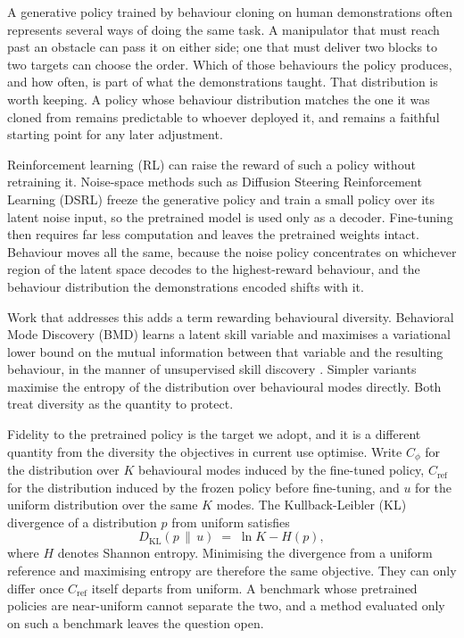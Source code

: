 \documentclass[preprint,12pt]{elsarticle}
\begin{document}
A generative policy trained by behaviour cloning on human demonstrations often
represents several ways of doing the same task. A manipulator that must reach
past an obstacle can pass it on either side; one that must deliver two blocks to
two targets can choose the order. Which of those behaviours the policy produces, and how often, is part of what
the demonstrations taught. That distribution is worth keeping. A policy whose
behaviour distribution matches the one it was cloned from remains predictable to
whoever deployed it, and remains a faithful starting point for any later
adjustment.

Reinforcement learning (RL) can raise the reward of such a policy without
retraining it. Noise-space methods such as Diffusion Steering Reinforcement
Learning (DSRL)
\citep{wagenmaker2025dsrl} freeze the generative policy and train a small
policy over its latent noise input, so the pretrained model is used only as a
decoder. Fine-tuning then requires far less computation and leaves the
pretrained weights intact. Behaviour moves all the same, because the noise policy
concentrates on whichever region of the latent space decodes to the
highest-reward behaviour, and the behaviour distribution the demonstrations
encoded shifts with it.

Work that addresses this adds a term rewarding behavioural diversity. Behavioral
Mode Discovery (BMD) \citep{longhini2026bmd} learns a latent skill variable and
maximises a variational lower bound on the mutual information between that
variable and the resulting behaviour, in the manner of unsupervised skill
discovery \citep{eysenbach2018diayn}. Simpler variants maximise the entropy of
the distribution over behavioural modes directly. Both treat diversity as the
quantity to protect.

Fidelity to the pretrained policy is the target we adopt, and it is a different
quantity from the diversity the objectives in current use optimise.
Write $C_\phi$ for the distribution over $K$ behavioural modes induced by
the fine-tuned policy, $C_{\mathrm{ref}}$ for the distribution induced by the
frozen policy before fine-tuning, and $u$ for the uniform distribution over the
same $K$ modes. The Kullback-Leibler (KL) divergence of a distribution $p$ from
uniform satisfies
\begin{equation}\label{eq:identity}
  D_{\mathrm{KL}}(p \,\|\, u) \;=\; \ln K - H(p),
\end{equation}
where $H$ denotes Shannon entropy. Minimising the divergence from a uniform
reference and maximising entropy are therefore the same objective. They can only
differ once $C_{\mathrm{ref}}$ itself departs from uniform. A benchmark whose
pretrained policies are near-uniform cannot separate the two, and a method
evaluated only on such a benchmark leaves the question open.
\end{document}
